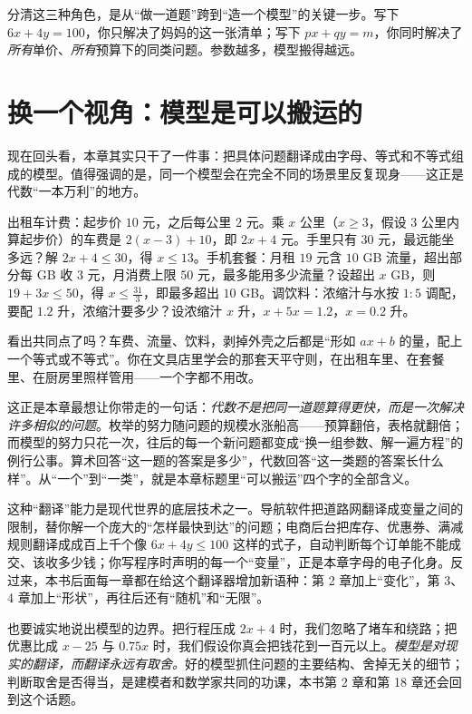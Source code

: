分清这三种角色，是从“做一道题”跨到“造一个模型”的关键一步。写下 $6x+4y=100$，你只解决了妈妈的这一张清单；写下 $px+qy=m$，你同时解决了\emph{所有}单价、\emph{所有}预算下的同类问题。参数越多，模型搬得越远。

\section{换一个视角：模型是可以搬运的}

现在回头看，本章其实只干了一件事：把具体问题翻译成由字母、等式和不等式组成的模型。值得强调的是，同一个模型会在完全不同的场景里反复现身——这正是代数“一本万利”的地方。

出租车计费：起步价 $10$ 元，之后每公里 $2$ 元。乘 $x$ 公里（$x\geq3$，假设 $3$ 公里内算起步价）的车费是 $2(x-3)+10$，即 $2x+4$ 元。手里只有 $30$ 元，最远能坐多远？解 $2x+4\leq30$，得 $x\leq13$。手机套餐：月租 $19$ 元含 $10$ GB 流量，超出部分每 GB 收 $3$ 元，月消费上限 $50$ 元，最多能用多少流量？设超出 $x$ GB，则 $19+3x\leq50$，得 $x\leq\frac{31}{3}$，即最多超出 $10$ GB。调饮料：浓缩汁与水按 $1:5$ 调配，要配 $1.2$ 升，浓缩汁要多少？设浓缩汁 $x$ 升，$x+5x=1.2$，$x=0.2$ 升。

看出共同点了吗？车费、流量、饮料，剥掉外壳之后都是“形如 $ax+b$ 的量，配上一个等式或不等式”。你在文具店里学会的那套天平守则，在出租车里、在套餐里、在厨房里照样管用——一个字都不用改。

这正是本章最想让你带走的一句话：\emph{代数不是把同一道题算得更快，而是一次解决许多相似的问题}。枚举的努力随问题的规模水涨船高——预算翻倍，表格就翻倍；而模型的努力只花一次，往后的每一个新问题都变成“换一组参数、解一遍方程”的例行公事。算术回答“这一题的答案是多少”，代数回答“这一类题的答案长什么样”。从“一个”到“一类”，就是本章标题里“可以搬运”四个字的全部含义。

\begin{lianjie}
这种“翻译”能力是现代世界的底层技术之一。导航软件把道路网翻译成变量之间的限制，替你解一个庞大的“怎样最快到达”的问题；电商后台把库存、优惠券、满减规则翻译成成百上千个像 $6x+4y\leq100$ 这样的式子，自动判断每个订单能不能成交、该收多少钱；你写程序时声明的每一个“变量”，正是本章字母的电子化身。反过来，本书后面每一章都在给这个翻译器增加新语种：第 2 章加上“变化”，第 3、4 章加上“形状”，再往后还有“随机”和“无限”。
\end{lianjie}

也要诚实地说出模型的边界。把行程压成 $2x+4$ 时，我们忽略了堵车和绕路；把优惠比成 $x-25$ 与 $0.75x$ 时，我们假设你真会把钱花到一百元以上。\emph{模型是对现实的翻译，而翻译永远有取舍。}好的模型抓住问题的主要结构、舍掉无关的细节；判断取舍是否得当，是建模者和数学家共同的功课，本书第 2 章和第 18 章还会回到这个话题。

